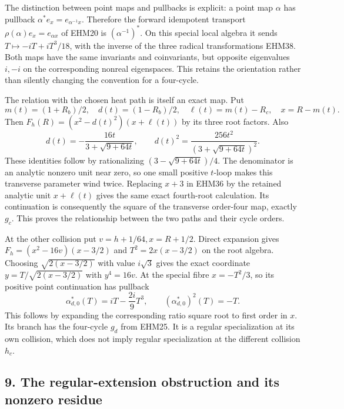 \documentclass[
  10pt,
  a4paper,
]{article}
\begin{document}
The distinction between point maps and pullbacks is explicit: a point
map \(\alpha\) has pullback \(\alpha^*e_x=e_{\alpha^{-1}x}\). Therefore
the forward idempotent transport \(\rho(\alpha)e_x=e_{\alpha x}\) of
EHM20 is \((\alpha^{-1})^*\). On this special local algebra it sends
\(T\mapsto-iT+iT^3/18\), with the inverse of the three radical
transformations EHM38. Both maps have the same invariants and
coinvariants, but opposite eigenvalues \(i,-i\) on the corresponding
nonreal eigenspaces. This retains the orientation rather than silently
changing the convention for a four-cycle.

The relation with the chosen heat path is itself an exact map. Put \[
m(t)=(1+R_b)/2,\quad d(t)=(1-R_b)/2,
\quad\ell(t)=m(t)-R_c,\quad x=R-m(t).
\tag{EHM39}
\] Then \(F_h(R)=(x^2-d(t)^2)(x+\ell(t))\) by its three root factors.
Also \[
d(t)=-\frac{16t}{3+\sqrt{9+64t}},\qquad
d(t)^2=\frac{256t^2}{(3+\sqrt{9+64t})^2}.
\tag{EHM40}
\] These identities follow by rationalizing \((3-\sqrt{9+64t})/4\). The
denominator is an analytic nonzero unit near zero, so one small positive
\(t\)-loop makes this transverse parameter wind twice. Replacing \(x+3\)
in EHM36 by the retained analytic unit \(x+\ell(t)\) gives the same
exact fourth-root calculation. Its continuation is consequently the
square of the transverse order-four map, exactly \(g_c\). This proves
the relationship between the two paths and their cycle orders.

At the other collision put \(v=h+1/64,x=R+1/2\). Direct expansion gives
\(F_h=(x^2-16v)(x-3/2)\) and \(T^2=2x(x-3/2)\) on the root algebra.
Choosing \(\sqrt{2(x-3/2)}\) with value \(i\sqrt3\) gives the exact
coordinate \(y=T/\sqrt{2(x-3/2)}\) with \(y^4=16v\). At the special
fibre \(x=-T^2/3\), so its positive point continuation has pullback \[
\alpha_{d,0}^*(T)=iT-\frac{2i}{9}T^3,\qquad
(\alpha_{d,0}^*)^2(T)=-T.
\tag{EHM41}
\] This follows by expanding the corresponding ratio square root to
first order in \(x\). Its branch has the four-cycle \(g_d\) from EHM25.
It is a regular specialization at its own collision, which does not
imply regular specialization at the different collision \(h_c\).

\subsection{9. The regular-extension obstruction and its nonzero
residue}\label{the-regular-extension-obstruction-and-its-nonzero-residue}
\end{document}
